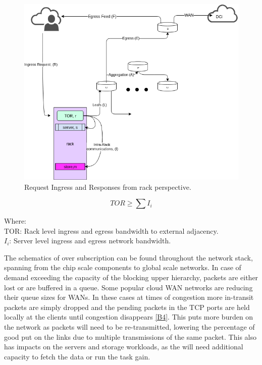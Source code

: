 \documentclass[conference]{IEEEtran}
\begin{document}
\begin{figure}[htbp]
\centering
\includegraphics[scale=.35]{rack_view.png}
\caption{Request Ingress and Responses from rack perspective.}
\label{DCN}
\end{figure}

\begin{equation}
\label{TOR}
TOR \geq \sum{I_{i}}
\end{equation}

\begin{footnotesize}
Where: \\
\indent TOR: Rack level ingress and egress bandwidth to external adjacency.\\
\indent $I_{i}$: Server level ingress and egress network bandwidth.\\
\end{footnotesize}

The schematics of over subscription can be found throughout the network stack, spanning from the chip scale components to global scale networks. In case of demand exceeding the capacity of the blocking upper hierarchy, packets are either lost or are buffered in a queue. Some popular cloud WAN networks are reducing their queue sizes for WANs. In these cases at times of congestion more in-transit packets are simply dropped and the pending packets in the TCP ports are held locally at the clients until congestion disappears \ref{B4}. This puts more burden on the network as packets will need to be re-transmitted, lowering the percentage of good put on the links due to multiple transmissions of the same packet. This also has impacts on the servers and storage workloads, as the will need additional capacity to fetch the data or run the task gain. 
\end{document}
